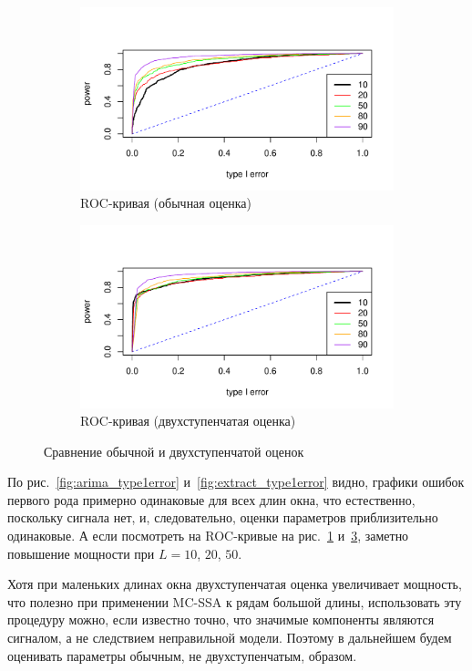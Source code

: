 \documentclass[specialist,
substylefile = spbu_report.rtx,
subf,href,colorlinks=true, 12pt]{disser}
\theoremstyle{definition}
\begin{document}
\begin{figure}[h!]
\begin{subfigure}[t]{0.5\textwidth}
		\includegraphics[width=\textwidth]{img/roc_arima.pdf}
		\caption{ROC-кривая (обычная оценка)}
		\label{fig:arima_roc}
	\end{subfigure}\hspace{\fill}
	\begin{subfigure}[t]{0.5\textwidth}
		\centering
		\includegraphics[width=\textwidth]{img/roc_extract.pdf}
		\caption{ROC-кривая (двухступенчатая оценка)}
		\label{fig:extract_roc}
	\end{subfigure}
	\caption{Сравнение обычной и двухступенчатой оценок}
\end{figure}

По рис.~\ref{fig:arima_type1error} и~\ref{fig:extract_type1error} видно, графики ошибок первого рода примерно одинаковые для всех длин окна, что естественно, поскольку сигнала нет, и, следовательно, оценки параметров приблизительно одинаковые. А если посмотреть на ROC-кривые на рис.~\ref{fig:arima_roc} и~\ref{fig:extract_roc}, заметно повышение мощности при $L=10$, $20$, $50$. 

Хотя при маленьких длинах окна двухступенчатая оценка увеличивает мощность, что полезно при применении MC-SSA к рядам большой длины, использовать эту процедуру можно, если известно точно, что значимые компоненты являются сигналом, а не следствием неправильной модели. Поэтому в дальнейшем будем оценивать параметры обычным, не двухступенчатым, образом.
\end{document}
